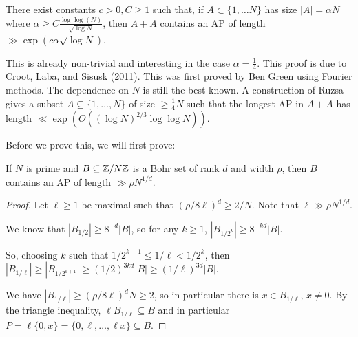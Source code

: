 \documentclass[10pt,a4paper]{article}
\begin{document}
\begin{theorem}
  There exist constants $c>0, C \geq 1$ such that, if $A \subset \{1, \ldots N\}$ has size $|A| = \alpha N$ where $\alpha \geq C \frac{\log\log(N)}{\sqrt{\log N}}$, then $A+A$ contains an AP of length $\gg \exp(c \alpha \sqrt{\log N})$.
\end{theorem}
This is already non-trivial and interesting in the case $\alpha = \frac14$. This proof is due to Croot, Laba, and Sisusk (2011). This was first proved by Ben Green using Fourier methods. The dependence on $N$ is still the best-known. A construction of Ruzsa gives a subset $A \subseteq \{1, \ldots, N\}$ of size $\geq \frac14 N$ such that the longest AP in $A+A$ has length $\ll \exp(O((\log N)^{2/3}\log\log N))$.

Before we prove this, we will first prove:
\begin{lemma}
  If $N$ is prime and $B \subseteq \mathbb{Z}/N\mathbb{Z}$ is a Bohr set of rank $d$ and width $\rho$, then $B$ contains an AP of length $\gg \rho N^{1/d}$.
\end{lemma}
\begin{proof}
  Let $\ell \geq 1$ be maximal such that $(\rho/8\ell)^d \geq 2/N$. Note that $\ell \gg \rho N^{1/d}$.

  We know that $|B_{1/2}| \geq 8^{-d} |B|$, so for any $k \geq 1$, $|B_{1/2^k}| \geq 8^{-kd}|B|$.

  So, choosing $k$ such that $1/2^{k+1} \leq 1/\ell < 1/2^k$, then $|B_{1/\ell}| \geq |B_{1/2^{k+1}}| \geq (1/2)^{3kd}|B| \geq (1/\ell)^{3d} |B|$.

  We have $|B_{1/\ell}| \geq (\rho/8\ell)^d N \geq 2$, so in particular there is $x \in B_{1/\ell}$, $x \neq 0$. By the triangle inequality, $\ell B_{1/\ell} \subseteq B$ and in particular $P = \ell\{0,x\} = \{0, \ell, \ldots, \ell x\} \subseteq B$.
\end{proof}
\end{document}
